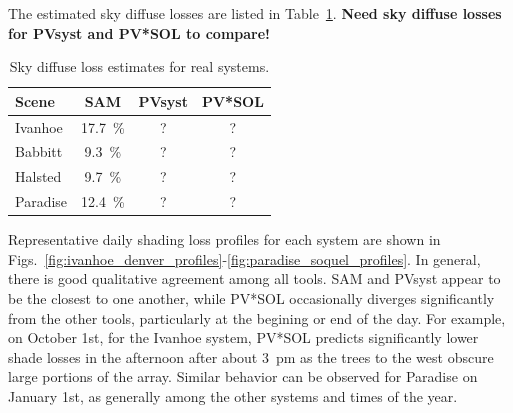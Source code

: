 \documentclass[twocolumn,10pt]{asme2ej}
\begin{document}
The estimated sky diffuse losses are listed in Table~\ref{tab:diffuse_loss_systems}.  \textbf{Need sky diffuse losses for PVsyst and PV*SOL to compare!}

\begin{table}[h!]
\begin{center}
\begin{tabular}{lccc}
Scene & SAM & PVsyst & PV*SOL \\
\hline
Ivanhoe & 17.7~\% & ? & ? \\
Babbitt  & 9.3~\% & ? & ? \\
Halsted  & 9.7~\% & ? & ? \\
Paradise & 12.4~\% & ? & ? \\
\end{tabular}
\caption{Sky diffuse loss estimates for real systems.}
\label{tab:diffuse_loss_systems}
\end{center}
\end{table}


Representative daily shading loss profiles for each system are shown in Figs.~\ref{fig:ivanhoe_denver_profiles}-\ref{fig:paradise_soquel_profiles}.  In general, there is good qualitative agreement among all tools.  SAM and PVsyst appear to be the closest to one another, while PV*SOL occasionally diverges significantly from the other tools, particularly at the begining or end of the day.  For example, on October 1st, for the Ivanhoe system, PV*SOL predicts significantly lower shade losses in the afternoon after about 3~pm as the trees to the west obscure large portions of the array.  Similar behavior can be observed for Paradise on January 1st, as generally among the other systems and times of the year.  
\end{document}
